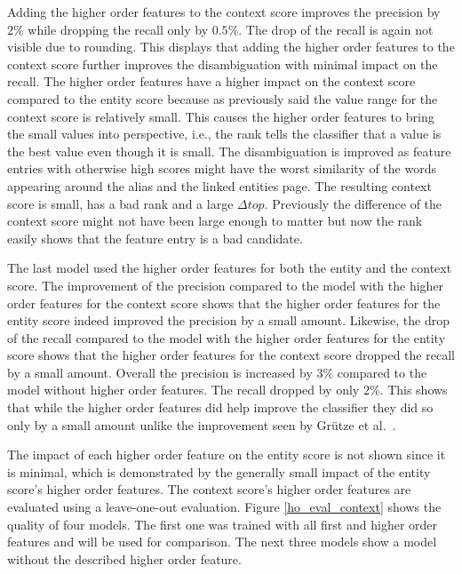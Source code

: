 Adding the higher order features to the context score improves the precision by $2\%$ while dropping the recall only by $0.5\%$. The drop of the recall is again not visible due to rounding. This displays that adding the higher order features to the context score further improves the disambiguation with minimal impact on the recall. The higher order features have a higher impact on the context score compared to the entity score because as previously said the value range for the context score is relatively small. This causes the higher order features to bring the small values into perspective, i.e., the rank tells the classifier that a value is the best value even though it is small. The disambiguation is improved as feature entries with otherwise high scores might have the worst similarity of the words appearing around the alias and the linked entities page. The resulting context score is small, has a bad rank and a large $\Delta top$. Previously the difference of the context score might not have been large enough to matter but now the rank easily shows that the feature entry is a bad candidate.\par
The last model used the higher order features for both the entity and the context score. The improvement of the precision compared to the model with the higher order features for the context score shows that the higher order features for the entity score indeed improved the precision by a small amount. Likewise, the drop of the recall compared to the model with the higher order features for the entity score shows that the higher order features for the context score dropped the recall by a small amount. Overall the precision is increased by $3\%$ compared to the model without higher order features. The recall dropped by only $2\%$. This shows that while the higher order features did help improve the classifier they did so only by a small amount unlike the improvement seen by Grütze et al.\ \cite{coheel}.\par
The impact of each higher order feature on the entity score is not shown since it is minimal, which is demonstrated by the generally small impact of the entity score's higher order features. The context score's higher order features are evaluated using a leave-one-out evaluation. Figure \ref{ho_eval_context} shows the quality of four models. The first one was trained with all first and higher order features and will be used for comparison. The next three models show a model without the described higher order feature.\par
